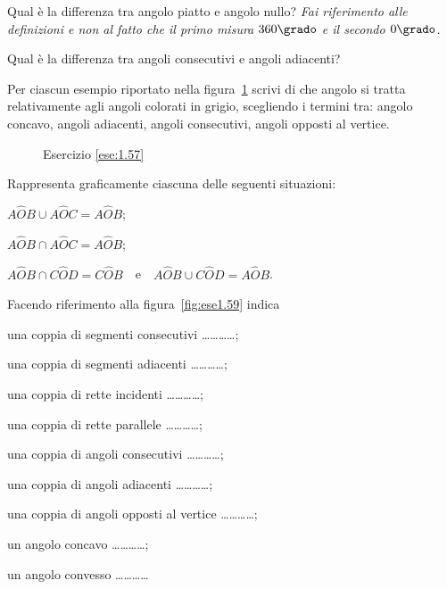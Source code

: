 \begin{esercizio}
\label{ese:1.55}
Qual è la differenza tra angolo piatto e angolo nullo? \emph{Fai 
riferimento alle definizioni e non al fatto che il primo misura 
$360\grado$ e il secondo $0\grado$.}
\end{esercizio}

\begin{esercizio}
\label{ese:1.56}
Qual è la differenza tra angoli consecutivi e angoli adiacenti?
\end{esercizio}

\begin{esercizio}
\label{ese:1.57}
Per ciascun esempio riportato nella figura~\ref{fig:ese1.57} scrivi 
di che angolo si tratta relativamente agli angoli colorati in grigio, 
scegliendo i termini tra: angolo concavo, angoli adiacenti, angoli 
consecutivi, angoli opposti al vertice.
\end{esercizio}


\begin{inaccessibleblock}
 \begin{figure}[htb]
 \centering
 \caption{Esercizio \ref{ese:1.57}}\label{fig:ese1.57}
\end{figure}
\end{inaccessibleblock}

\begin{esercizio}
\label{ese:1.58}
Rappresenta graficamente ciascuna delle seguenti situazioni:
\begin{enumeratea}
\item $A\widehat{O}B\cup A\widehat{O}C=A\widehat{O}B$;
\item $A\widehat{O}B\cap A\widehat{O}C=A\widehat{O}B$;
\item $A\widehat{O}B\cap 
C\widehat{O}D=C\widehat{O}B$~~e~~$A\widehat{O}B\cup 
C\widehat{O}D=A\widehat{O}B$.
\end{enumeratea}
\end{esercizio}

\begin{esercizio}
\label{ese:1.59}
Facendo riferimento alla figura~\ref{fig:ese1.59} indica
\begin{enumeratea}
\item una coppia di segmenti consecutivi \ldots\ldots\ldots\ldots{};
\item una coppia di segmenti adiacenti \ldots\ldots\ldots\ldots{};
\item una coppia di rette incidenti \ldots\ldots\ldots\ldots{};
\item una coppia di rette parallele \ldots\ldots\ldots\ldots{};
\item una coppia di angoli consecutivi \ldots\ldots\ldots\ldots{};
\item una coppia di angoli adiacenti \ldots\ldots\ldots\ldots{};
\item una coppia di angoli opposti al vertice 
\ldots\ldots\ldots\ldots{};
\item un angolo concavo \ldots\ldots\ldots\ldots{};
\item un angolo convesso \ldots\ldots\ldots\ldots{}
\end{enumeratea}
\end{esercizio}


